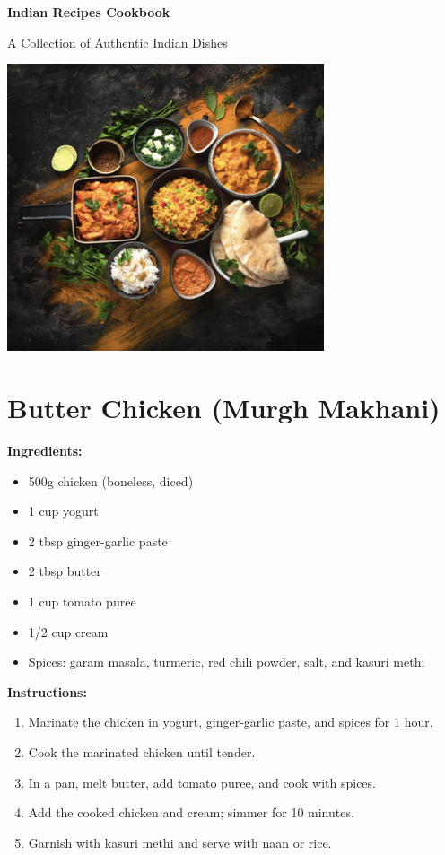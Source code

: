\documentclass[12pt]{article}
\begin{document}
\begin{titlepage}
    \centering
    \vspace*{2cm}
    {\Huge\bfseries Indian Recipes Cookbook\par}
    \vspace{1.5cm}
    {\Large A Collection of Authentic Indian Dishes\par}
    \vfill
    \includegraphics[width=0.7\textwidth]{all_food.png} 
    \vfill
    
\end{titlepage}


\tableofcontents %
\newpage

\section{Butter Chicken (Murgh Makhani)}
\label{sec:butter_chicken}
\textbf{Ingredients:}
\begin{itemize}
    \item 500g chicken (boneless, diced)
    \item 1 cup yogurt
    \item 2 tbsp ginger-garlic paste
    \item 2 tbsp butter
    \item 1 cup tomato puree
    \item 1/2 cup cream
    \item Spices: garam masala, turmeric, red chili powder, salt, and kasuri methi
\end{itemize}

\textbf{Instructions:}
\begin{enumerate}
    \item Marinate the chicken in yogurt, ginger-garlic paste, and spices for 1 hour.
    \item Cook the marinated chicken until tender.
    \item In a pan, melt butter, add tomato puree, and cook with spices.
    \item Add the cooked chicken and cream; simmer for 10 minutes.
    \item Garnish with kasuri methi and serve with naan or rice.
\end{enumerate}
\end{document}
